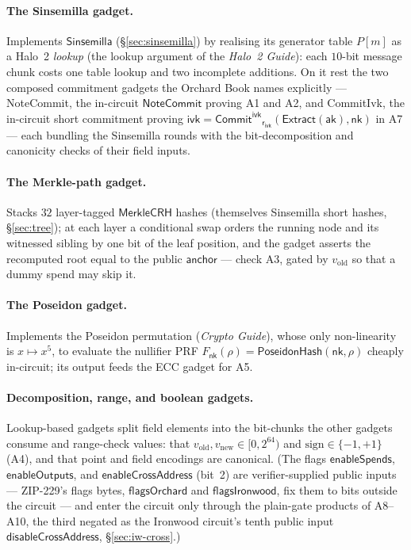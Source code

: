\documentclass[11pt,a4paper]{article}
\theoremstyle{definition}
\newcommand{\NoteCommit}{\ensuremath{\mathsf{NoteCommit}}}
\newcommand{\Sinsemilla}{\ensuremath{\mathsf{Sinsemilla}}}
\newcommand{\CommitIvk}{\ensuremath{\mathsf{Commit}^{\mathsf{ivk}}}}
\newcommand{\Extract}{\ensuremath{\mathsf{Extract}}}
\newcommand{\aksym}{\ensuremath{\mathsf{ak}}}
\newcommand{\nksym}{\ensuremath{\mathsf{nk}}}
\newcommand{\ivk}{\ensuremath{\mathsf{ivk}}}
\newcommand{\rivk}{\ensuremath{\mathsf{r_{ivk}}}}
\begin{document}
\paragraph{The Sinsemilla gadget.} Implements $\Sinsemilla$
(\S\ref{sec:sinsemilla}) by realising its generator table $P[m]$ as a Halo~2
\emph{lookup} (the lookup argument of the \emph{Halo~2 Guide}): each $10$-bit
message chunk costs one table lookup and two incomplete additions. On it rest
the two composed commitment gadgets the Orchard Book names explicitly ---
\textsf{NoteCommit}, the in-circuit $\NoteCommit$ proving A1 and A2, and
\textsf{CommitIvk}, the in-circuit short commitment proving
$\ivk = \CommitIvk_{\rivk}(\Extract(\aksym),\nksym)$ in A7 --- each bundling the
Sinsemilla rounds with the bit-decomposition and canonicity checks of their field
inputs.

\paragraph{The Merkle-path gadget.} Stacks $32$ layer-tagged $\mathsf{MerkleCRH}$
hashes (themselves Sinsemilla short hashes, \S\ref{sec:tree}); at each layer a
conditional swap orders the running node and its witnessed sibling by one bit of
the leaf position, and the gadget asserts the recomputed root equal to the public
$\mathsf{anchor}$ --- check A3, gated by $v_{\mathrm{old}}$ so that a dummy spend
may skip it.

\paragraph{The Poseidon gadget.} Implements the Poseidon permutation
(\emph{Crypto Guide}), whose only non-linearity is $x \mapsto x^{5}$, to evaluate
the nullifier PRF $F_{\nksym}(\rho) = \mathsf{PoseidonHash}(\nksym,\rho)$ cheaply
in-circuit; its output feeds the ECC gadget for A5.

\paragraph{Decomposition, range, and boolean gadgets.} Lookup-based gadgets
split field elements into the bit-chunks the other gadgets consume and
range-check values: that $v_{\mathrm{old}}, v_{\mathrm{new}} \in [0, 2^{64})$ and
$\mathrm{sign} \in \{-1,+1\}$ (A4), and that point and field encodings are
canonical. (The flags $\mathsf{enableSpends}$, $\mathsf{enableOutputs}$, and
$\mathsf{enableCrossAddress}$ (bit~2) are verifier-supplied public inputs
--- ZIP-229's flags bytes, $\mathsf{flagsOrchard}$ and
$\mathsf{flagsIronwood}$, fix them to bits outside the circuit --- and enter
the circuit only through the plain-gate products of A8--A10, the third
negated as the Ironwood circuit's tenth public input
$\mathsf{disableCrossAddress}$, \S\ref{sec:iw-cross}.)
\end{document}
